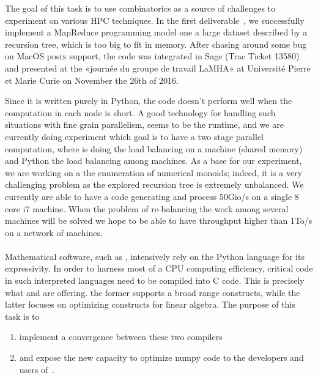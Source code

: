 \documentclass{deliverablereport}
\begin{document}
  The goal of this task is to use combinatorics as a source of challenges to
  experiment on various HPC techniques. In the first
  deliverable~, we successfully implement a
  MapReduce programming model one a large dataset described by a recursion
  tree, which is too big to fit in memory. After chasing around some bug on
  MacOS posix support, the code was integrated in Sage (Trac Ticket 13580) and
  presented at the «journée du groupe de travail LaMHA» at Université Pierre et
  Marie Curie on November the 26th of 2016.

  Since it is written purely in Python, the code doesn't perform well when the
  computation in each node is short. A good technology for handling such
  situations with fine grain parallelism, seems to be the 
   runtime, and we are currently doing experiment which goal is to have a two
  stage parallel computation, where  is doing the load balancing on a
  machine (shared memory) and Python the load balancing among machines. As a
  base for our experiment, we are working on a the enumeration of numerical
  monoids; indeed, it is a very challenging problem as the explored recursion
  tree is extremely unbalanced. We currently are able to have a code
  generating and process 50Gio/s on a single 8 core i7 machine. When the
  problem of re-balancing the work among several machines will be solved we
  hope to be able to have throughput higher than 1To/s on a network of machines.

  \paragraph{}

Mathematical software, such as \Sage, intensively rely on the Python
language for its expressivity. In order to harness most of a CPU computing
efficiency, critical code in such interpreted languages need to be compiled into
C code. This is precisely what \Cython and \Pythran are offering. the former
supports a broad range \Python constructs, while the latter focuses on optimizing
\Numpy constructs for linear algebra.
The purpose of this task is to
\begin{enumerate}
\item\label{pythran:cython} implement a convergence between these two compilers
\item\label{pythran:sage} and expose the new capacity to optimize numpy code to
  the developers and  users of~\Sage.
\end{enumerate}
\end{document}
